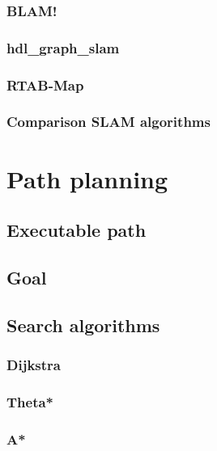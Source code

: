 \documentclass[12pt, a4paper]{report}
\begin{document}
        \subsubsection{BLAM!}
        
        \subsubsection{hdl\_graph\_slam}
        
        \subsubsection{RTAB-Map}
        
        \subsubsection{Comparison SLAM algorithms}
        
        \newpage
    \section{Path planning}
    
      \subsection{Executable path}
      
      \subsection{Goal}
      
      \subsection{Search algorithms}
        \subsubsection{Dijkstra}
        \subsubsection{Theta*}
        \subsubsection{A*}
\end{document}
